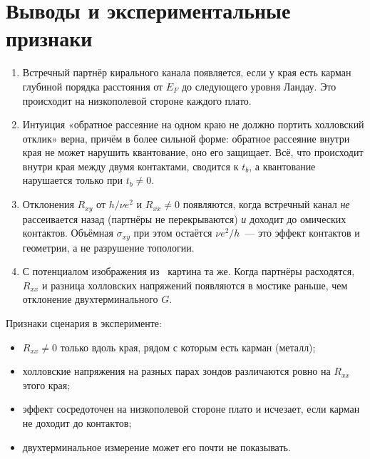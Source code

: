 \documentclass[11pt,a4paper]{article}
\newcommand{\tb}{t_b}
\newcommand{\Rxy}{R_{xy}}
\newcommand{\Rxx}{R_{xx}}
\newcommand{\EF}{E_F}
\begin{document}
\section{Выводы и экспериментальные признаки}

\begin{enumerate}
\item Встречный партнёр кирального канала появляется, если у края есть
  карман глубиной порядка расстояния от $\EF$ до следующего уровня Ландау.
  Это происходит на низкополевой стороне каждого плато.
\item Интуиция «обратное рассеяние на одном краю не должно портить холловский
  отклик» верна, причём в более сильной форме: обратное рассеяние внутри края
  не может нарушить квантование, оно его защищает. Всё, что происходит внутри
  края между двумя контактами, сводится к $\tb$, а квантование нарушается
  только при $\tb\neq0$.
\item Отклонения $\Rxy$ от $h/\nu e^2$ и $\Rxx\neq0$ появляются, когда
  встречный канал \emph{не} рассеивается назад (партнёры не перекрываются)
  \emph{и} доходит до омических контактов. Объёмная $\sigma_{xy}$ при этом
  остаётся $\nu e^2/h$~--- это эффект контактов и геометрии, а не разрушение
  топологии.
\item С потенциалом изображения из~\cite{andolina} картина та же. Когда
  партнёры расходятся, $\Rxx$ и разница холловских напряжений появляются в
  мостике раньше, чем отклонение двухтерминального $G$.
\end{enumerate}
Признаки сценария в эксперименте:
\begin{itemize}
\item $\Rxx\neq0$ только вдоль края, рядом с которым есть карман (металл);
\item холловские напряжения на разных парах зондов различаются ровно на
  $\Rxx$ этого края;
\item эффект сосредоточен на низкополевой стороне плато и исчезает, если
  карман не доходит до контактов;
\item двухтерминальное измерение может его почти не показывать.
\end{itemize}

\end{document}
